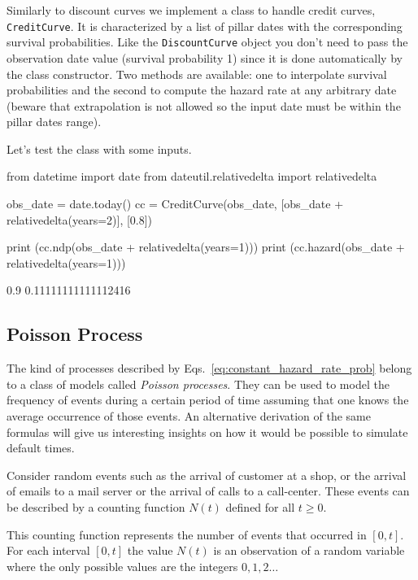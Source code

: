 \begin{finmarkets}
Similarly to discount curves we implement a class to handle credit curves, \texttt{CreditCurve}. It is characterized by a list of pillar dates with the corresponding survival probabilities. Like the \texttt{DiscountCurve} object you don't need to pass the observation date value (survival probability 1) since it is done automatically by the class constructor. Two methods are available: one to interpolate survival probabilities and the second to compute the hazard rate at any arbitrary date (beware that extrapolation is not allowed so the input date must be within the pillar dates range).
\end{finmarkets}


Let's test the class with some inputs.
\begin{ipython}
from datetime import date
from dateutil.relativedelta import relativedelta

obs_date = date.today()
cc = CreditCurve(obs_date, [obs_date + relativedelta(years=2)], [0.8])

print (cc.ndp(obs_date + relativedelta(years=1)))
print (cc.hazard(obs_date + relativedelta(years=1)))
\end{ipython}
\begin{ioutput}
0.9
0.11111111111112416
\end{ioutput}

\subsection{Poisson Process}
\label{sec:poisson_process}

The kind of processes described by Eqs.~\ref{eq:constant_hazard_rate_prob} belong to a class of models called \emph{Poisson processes}. 
They can be used to model the frequency of events during a certain period of time assuming that one knows the average occurrence of those events. An alternative derivation of the same formulas will give us interesting insights on how it would be possible to simulate default times.

Consider random events such as the arrival of customer at a shop, or the arrival of emails to a mail server or the arrival of calls to a call-center. These events can be described by a counting function $N(t)$ defined for all $t\ge 0$.

This counting function represents the number of events that occurred in $[0, t]$. For each interval $[0,t]$ the value $N(t)$ is an observation of a random variable where the only possible values are the integers $0, 1, 2\ldots$

